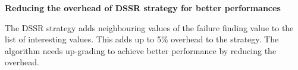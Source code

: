 \textbf{Reducing the overhead of DSSR strategy for better performances}

The DSSR strategy adds neighbouring values of the failure finding value to the list of interesting values. This adds up to 5\% overhead to the strategy. The algorithm needs up-grading to achieve better performance by reducing the overhead.











